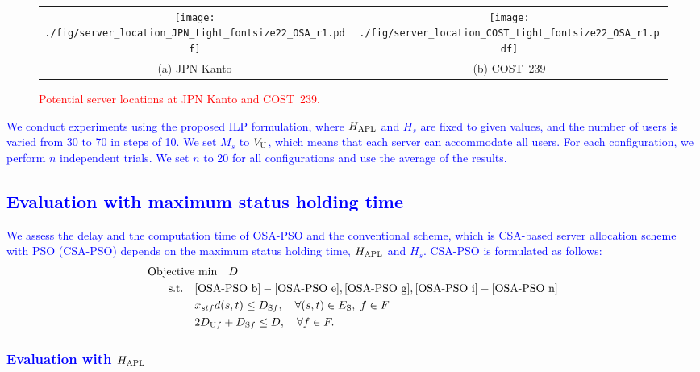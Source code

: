 \documentclass[10pt, letterpaper]{IEEEtran}
\newcommand\blue[1]{\textcolor{blue}{#1}}
\newcommand\red[1]{\textcolor{red}{#1}}
\begin{document}
\begin{CJK}{UTF8}{ipxm}
{\begin{figure}[t]
\begin{center}
      \begin{tabular}{cc}
      \texttt{[image: ./fig/server\_location\_JPN\_tight\_fontsize22\_OSA\_r1.pdf]} &
      \texttt{[image: ./fig/server\_location\_COST\_tight\_fontsize22\_OSA\_r1.pdf]} \\
      (a) JPN Kanto & (b) COST~239
      \end{tabular}
  \end{center}
  \caption{\red{Potential server locations at JPN Kanto and COST~239.}}
  \label{fig:ServerLocation}
\end{figure}
}

\blue{
We conduct experiments using the proposed ILP formulation, where $H_{\rm APL}$ and $H_s$ are fixed to given values, and the number of users is varied from 30 to 70 in steps of 10.
We set $M_s$ to $V_{\rm U}$, which means that each server can accommodate all users.
For each configuration, we perform $n$ independent trials.
We set $n$ to 20 for all configurations
and use the average of the results.
}

\subsection{\blue{Evaluation with maximum status holding time}}
\label{subsec:Evaluation with maximum status holding time}

\blue{
We assess the delay and the computation time of OSA-PSO and the conventional scheme, which is CSA-based server allocation scheme with PSO (CSA-PSO) depends on the maximum status holding time, $H_{\rm APL}$ and $H_s$.
CSA-PSO is formulated as follows:
\begin{subequations} \label{CSA-PSO}
  \begin{align}
  \text{Objective}&\text{ min}\quad D \label{CSA-PSO a} \\
  \rm{s.t.} \quad
  & \eqref{OSA-PSO b}-\eqref{OSA-PSO e}, \eqref{OSA-PSO g}, \eqref{OSA-PSO i}-\eqref{OSA-PSO n} \label{CSA-PSO b} \\
  &x_{stf}d(s,t) \le D_{\mathrm{S}f}, \quad \forall (s,t) \in E_{\rm{S}}, \; f \in F \label{CSA-PSO c} \\
  &2D_{\mathrm{U}f} + D_{\mathrm{S}f} \leq D, \quad \forall f \in F. \label{CSA-PSO d}
  \end{align}
\end{subequations}
}

\subsubsection{\blue{Evaluation with $H_{\rm APL}$}}


\end{CJK}
\end{document}
